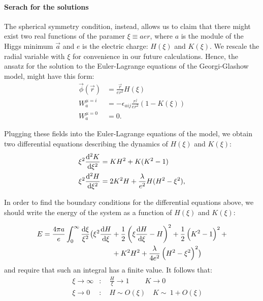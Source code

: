\documentclass[main.tex]{subfiles}
\begin{document}
   \paragraph{Serach for the solutions}The spherical symmetry condition, instead, allows us to claim that there might exist two real functions of the paramer $\xi \equiv aer$, where $a$ is the module of the Higgs minimum $\vec{a}$ and $e$ is the electric charge: $H(\xi)$ and $K(\xi)$. We rescale the radial variable with $\xi$ for convenience in our future calculations. Hence, the ansatz for the solution to the Euler-Lagrange equations of the Georgi-Glashow model, might have this form: 
\begin{subequations}
  \begin{align}
      \vec{\phi}(\vec{r}) &= \frac{\vec{r}}{er^2}H(\xi) \\ 
      W^{\mu =i}_{a} &= - \epsilon_{aij}\frac{r^j}{er^2}(1 - K(\xi)) \\
      W^{\mu=0}_{a}&=0. 
  \end{align}
\end{subequations}
  
  Plugging these fields into the Euler-Lagrange equations of the model, we obtain two differential equations describing the dynamics of $H(\xi)$ and $K(\xi)$: 
  \begin{subequations} \label{eq:thooft-polyakov-equations} 
  \begin{align}
  \xi ^2 \dv[2]{K}{\xi} &= KH^2 + K(K^2-1)   \label{eq:H}\\
  \xi ^2 \dv[2]{H}{\xi} &= 2K^2H + \frac{\lambda}{e^2}H (H^2 -\xi^2), \label{eq:K}
  \end{align}
  \end{subequations}
  
  In order to find the boundary conditions for the differential equations above, we should write the energy of the system as a function of $H(\xi)$ and $K(\xi)$:

  \begin{equation}
  \begin{split}
  E = \frac{4 \pi a}{e} \int_{0}^{\infty} \frac{\dd{\xi}}{\xi^2}  \bigr( \xi^2\dv{H}{\xi}  &+  \frac{1}{2}\left( \xi \dv{H}{\xi} -H \right)^2  +  
  \frac{1}{2} \left( K^2 - 1 \right)^2 +  \\
  & +K^2 H^2 + \frac{\lambda}{4e^2} \left( H^2-\xi^2\right)^2   \bigr)
  \end{split}
  \end{equation}
and require that such an integral has a finite value. It follows that: 
\begin{subequations}
  \begin{align}
 && \xi \to \infty &\colon  \quad \frac{H}{\xi} \to 1 \qquad \ K \to 0     \label{eq:bound1}\\
 && \xi  \to 0      &\colon  \quad H \sim  O(\xi)     \quad K \sim \ 1 + O(\xi)  \label{eq:bound2}
  \end{align}
\end{subequations}
 
\end{document}
